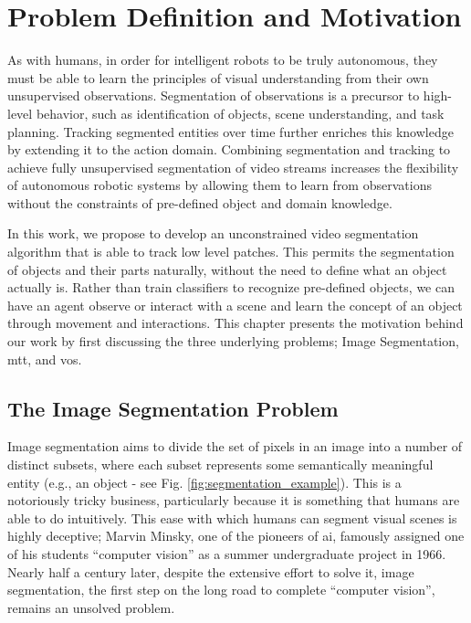 \section{Problem Definition and Motivation}
As with humans, in order for intelligent robots to be truly autonomous, they must be able to learn the principles of visual understanding from their own unsupervised observations. Segmentation of observations is a precursor to high-level behavior, such as identification of objects, scene understanding, and task planning. Tracking segmented entities over time further enriches this knowledge by extending it to the action domain. Combining segmentation and tracking to achieve fully unsupervised segmentation of video streams increases the flexibility of autonomous robotic systems by allowing them to learn from observations without the constraints of pre-defined object and domain knowledge.

In this work, we propose to develop an unconstrained video segmentation algorithm that is able to track low level patches. This permits the segmentation of objects and their parts naturally, without the need to define what an object actually is. Rather than train classifiers to recognize pre-defined objects, we can have an agent observe or interact with a scene and learn the concept of an object through movement and interactions. This chapter presents the motivation behind our work by first discussing the three underlying problems; Image Segmentation, \gls{mtt}, and \gls{vos}.

\subsection{The Image Segmentation Problem}
Image segmentation aims to divide the set of pixels in an image into a number of distinct subsets, where each subset represents some semantically meaningful entity (e.g., an object - see Fig. \ref{fig:segmentation_example}). This is a notoriously tricky business, particularly because it is something that humans are able to do intuitively. This ease with which humans can segment visual scenes is highly deceptive; Marvin Minsky, one of the pioneers of \gls{ai}, famously assigned one of his students ``computer vision'' as a summer undergraduate project in 1966. Nearly half a century later, despite the extensive effort to solve it, image segmentation, the first step on the long road to complete ``computer vision'', remains an unsolved problem. 

